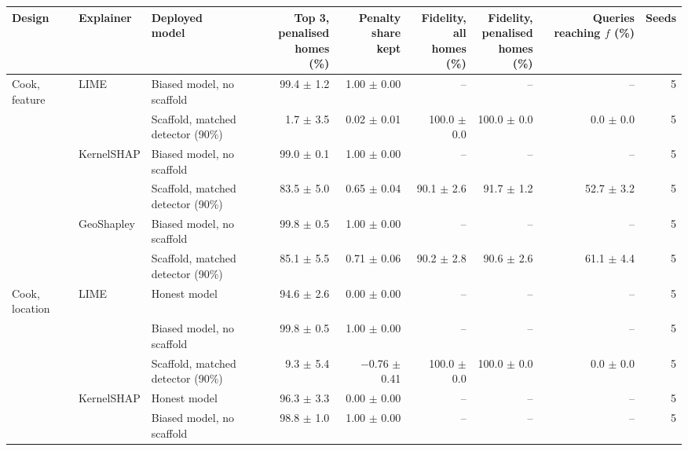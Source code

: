 \begin{table}[t]
\centering
\footnotesize
\setlength{\tabcolsep}{3.5pt}
\begin{adjustbox}{max width=\linewidth}
\begin{tabular}{lllrrrrrr}
\toprule
Design & Explainer & \makecell[b]{Deployed \\ model} & \makecell[b]{Top 3, \\ penalised \\ homes (\%)} & \makecell[b]{Penalty share \\ kept} & \makecell[b]{Fidelity, all \\ homes (\%)} & \makecell[b]{Fidelity, \\ penalised \\ homes (\%)} & \makecell[b]{Queries \\ reaching $f$ \\ (\%)} & Seeds \\
\midrule
Cook, feature & LIME & Biased model, no scaffold & 99.4 $\pm$ 1.2 & 1.00 $\pm$ 0.00 & -- & -- & -- & 5 \\
 &  & Scaffold, matched detector (90\%) & 1.7 $\pm$ 3.5 & 0.02 $\pm$ 0.01 & 100.0 $\pm$ 0.0 & 100.0 $\pm$ 0.0 & 0.0 $\pm$ 0.0 & 5 \\
 & KernelSHAP & Biased model, no scaffold & 99.0 $\pm$ 0.1 & 1.00 $\pm$ 0.00 & -- & -- & -- & 5 \\
 &  & Scaffold, matched detector (90\%) & 83.5 $\pm$ 5.0 & 0.65 $\pm$ 0.04 & 90.1 $\pm$ 2.6 & 91.7 $\pm$ 1.2 & 52.7 $\pm$ 3.2 & 5 \\
 & GeoShapley & Biased model, no scaffold & 99.8 $\pm$ 0.5 & 1.00 $\pm$ 0.00 & -- & -- & -- & 5 \\
 &  & Scaffold, matched detector (90\%) & 85.1 $\pm$ 5.5 & 0.71 $\pm$ 0.06 & 90.2 $\pm$ 2.8 & 90.6 $\pm$ 2.6 & 61.1 $\pm$ 4.4 & 5 \\
\midrule
Cook, location & LIME & Honest model & 94.6 $\pm$ 2.6 & 0.00 $\pm$ 0.00 & -- & -- & -- & 5 \\
 &  & Biased model, no scaffold & 99.8 $\pm$ 0.5 & 1.00 $\pm$ 0.00 & -- & -- & -- & 5 \\
 &  & Scaffold, matched detector (90\%) & 9.3 $\pm$ 5.4 & $-$0.76 $\pm$ 0.41 & 100.0 $\pm$ 0.0 & 100.0 $\pm$ 0.0 & 0.0 $\pm$ 0.0 & 5 \\
 & KernelSHAP & Honest model & 96.3 $\pm$ 3.3 & 0.00 $\pm$ 0.00 & -- & -- & -- & 5 \\
 &  & Biased model, no scaffold & 98.8 $\pm$ 1.0 & 1.00 $\pm$ 0.00 & -- & -- & -- & 5 \\

\end{tabular}
\end{adjustbox}
\end{table}
